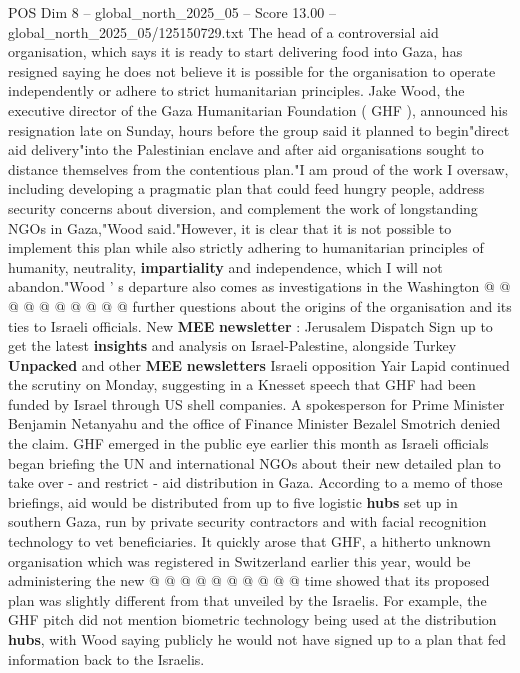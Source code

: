 \begin{textsample}{POS Dim 8 – global\_north\_2025\_05 – Score 13.00 – global\_north\_2025\_05/125150729.txt}  \label{ex:f8_pos_034}
The head of a controversial aid organisation, which says it is ready to start delivering food into Gaza, has resigned saying he does not believe it is possible for the organisation to operate independently or adhere to strict humanitarian principles.
Jake Wood, the executive director of the Gaza Humanitarian Foundation ( GHF ), announced his resignation late on Sunday, hours before the group said it planned to begin"direct aid delivery"into the Palestinian enclave and after aid organisations sought to distance themselves from the contentious plan."I am proud of the work I oversaw, including developing a pragmatic plan that could feed hungry people, address security concerns about diversion, and complement the work of longstanding NGOs in Gaza,"Wood said."However, it is clear that it is not possible to implement this plan while also strictly adhering to humanitarian principles of humanity, neutrality, \textbf{impartiality} and independence, which I will not abandon."Wood ' s departure also comes as investigations in the Washington @ @ @ @ @ @ @ @ @ @ further questions about the origins of the organisation and its ties to Israeli officials.
New \textbf{MEE} \textbf{newsletter} : Jerusalem Dispatch Sign up to get the latest \textbf{insights} and analysis on Israel-Palestine, alongside Turkey \textbf{Unpacked} and other \textbf{MEE} \textbf{newsletters} Israeli opposition Yair Lapid continued the scrutiny on Monday, suggesting in a Knesset speech that GHF had been funded by Israel through US shell companies.
A spokesperson for Prime Minister Benjamin Netanyahu and the office of Finance Minister Bezalel Smotrich denied the claim.
GHF emerged in the public eye earlier this month as Israeli officials began briefing the UN and international NGOs about their new detailed plan to take over - and restrict - aid distribution in Gaza.
According to a memo of those briefings, aid would be distributed from up to five logistic \textbf{hubs} set up in southern Gaza, run by private security contractors and with facial recognition technology to vet beneficiaries.
It quickly arose that GHF, a hitherto unknown organisation which was registered in Switzerland earlier this year, would be administering the new @ @ @ @ @ @ @ @ @ @ time showed that its proposed plan was slightly different from that unveiled by the Israelis.
For example, the GHF pitch did not mention biometric technology being used at the distribution \textbf{hubs}, with Wood saying publicly he would not have signed up to a plan that fed information back to the Israelis.

\end{textsample}
